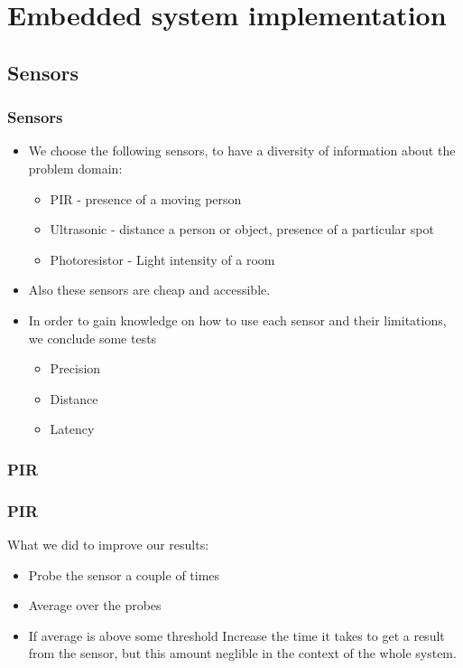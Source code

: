 \section{Embedded system implementation}
\lstset{language=HMMLanguage,numbers=left,breaklines=true,numbersep=0pt}
\subsection{Sensors}
\begin{frame}
	\frametitle{Sensors}
	\begin{itemize}
		\item We choose the following sensors, to have a diversity of information about the problem domain:
		\begin{itemize}
		  \item PIR - presence of a moving person
		  \item Ultrasonic - distance a person or object, presence of a particular spot
		  \item Photoresistor - Light intensity of a room
		\end{itemize}
		\item Also these sensors are cheap and accessible.
		\item In order to gain knowledge on how to use each sensor and their limitations, we conclude some tests
		\begin{itemize}
		  \item Precision
		  \item Distance
		  \item Latency
		\end{itemize}
	\end{itemize}
\end{frame}
\subsubsection{PIR}
\begin{frame}
  \frametitle{PIR}
  What we did to improve our results:
	\begin{itemize}
	  \item Probe the sensor a couple of times
	  \item Average over the probes
	  \item If average is above some threshold
	Increase the time it takes to get a result from the sensor, but this amount neglible in the context of the whole system.
	\end{itemize}
\end{frame}
